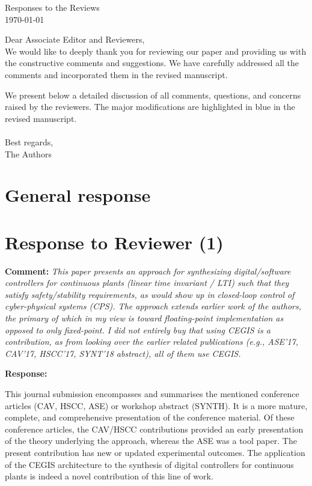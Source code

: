\documentclass{article}
\begin{document}
\begin{center}
{\Large Responses to the Reviews}\\\vspace{0.3cm}
\today
\end{center}
\vspace{1cm}
Dear Associate Editor and Reviewers,\vspace{0.3cm}
\\
We would like to deeply thank you for reviewing our paper and providing us with the constructive comments and suggestions. We have carefully addressed
all the comments and incorporated them in the revised manuscript.

We present below a detailed discussion of all comments, questions, and concerns raised by the reviewers. The major modifications are highlighted in
blue in the revised manuscript. 
\\
\\
Best regards,\vspace{0.1cm}
\\
The Authors
%
\newpage

\section{General response}




\section{Response to Reviewer (1)}
\bigskip

{\bf Comment: }{\itshape This paper presents an approach for synthesizing 
digital/software controllers for continuous plants (linear time invariant / LTI) 
such that they satisfy safety/stability requirements, as would show up in closed-loop 
control of cyber-physical systems (CPS). The approach extends earlier work of the authors, 
the primary of which in my view is toward floating-point implementation as opposed to only fixed-point. 
I did not entirely buy that using CEGIS is a contribution, as from looking over the earlier related publications 
(e.g., ASE'17, CAV'17, HSCC'17, SYNT'18 abstract), all of them use CEGIS.}

\vspace{1em}

{\bf Response: }

This journal submission encompasses and summarises the mentioned conference articles (CAV, HSCC, ASE) or workshop abstract (SYNTH). 
It is a more mature, complete, and comprehensive presentation of the conference material. 
Of these conference articles, the CAV/HSCC contributions provided an early presentation of the theory underlying the approach, 
whereas the ASE was a tool paper.  
The present contribution has new or updated experimental outcomes. 
The application of the CEGIS architecture to the synthesis of digital controllers for continuous plants is indeed a novel contribution of this line of
work. 
\end{document}
